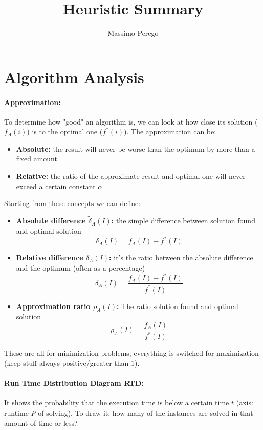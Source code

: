 \documentclass{article}
\title{Heuristic Summary}
\author{Massimo Perego}
\date{}
\begin{document}
	
	\maketitle
	
	\section*{Algorithm Analysis}
	
	\paragraph{Approximation:} To determine how "good" an algorithm is, we can look at how close its solution ($f_A (i)$) is to the optimal one ($f^\ast (i)$). The approximation can be: 
	\begin{itemize}
		\item \textbf{Absolute:} the result will never be worse than the optimum by more than a fixed amount
		\item\textbf{Relative:} the ratio of the approximate result and optimal one will never exceed a certain constant $\alpha$
	\end{itemize}
	Starting from these concepts we can define: 
	\begin{itemize}
		\item \textbf{Absolute difference $\tilde \delta_A(I)$:} the simple difference between solution found and optimal solution
		$$ \tilde{\delta}_A (I) = f_A (I) - f^\ast (I) $$
		\item \textbf{Relative difference $\delta_A (I)$:} it's the ratio between the absolute difference and the optimum (often as a percentage)
		$$ \delta_A(I) = \frac{f_A (I) - f^\ast (I)}{f^\ast (I)} $$
		\item \textbf{Approximation ratio $\rho_A (I)$:} The ratio solution found and optimal solution
		$$ \rho_A (I) = \frac{f_A (I)}{f^\ast (I)} $$
	\end{itemize}
	These are all for minimization problems, everything is switched for maximization (keep stuff always positive/greater than $1$).\\
	
	\paragraph{Run Time Distribution Diagram RTD:} It shows the probability that the execution time is below a certain time $t$ (axis: runtime-$P$ of solving). To draw it: how many of the instances are solved in that amount of time or less?\\
	
\end{document}
